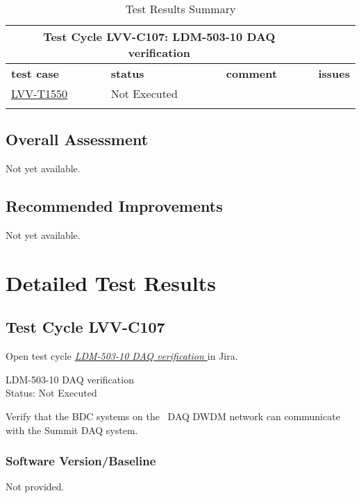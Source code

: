 \documentclass[DM,lsstdraft,STR,toc]{lsstdoc}
\begin{document}
\begin{longtable}{p{}p{}p{}p{}}
\toprule

  \multicolumn{3}{c}{ Test Cycle {\bf LVV-C107: LDM-503-10 DAQ verification
 }} \\\hline

  {\bf \footnotesize test case} & {\bf \footnotesize status} & {\bf \footnotesize comment} & {\bf \footnotesize issues} \\\toprule

    \href{https://jira.lsstcorp.org/secure/Tests.jspa#/testCase/LVV-T1550}{LVV-T1550}
    & Not Executed &  &
    \\\hline

\caption{Test Results Summary}
\label{table:summary}
\end{longtable}

\subsection{Overall Assessment}
\label{sect:overallassessment}

Not yet available.

\subsection{Recommended Improvements}
\label{sect:recommendations}

Not yet available.

\newpage
\section{Detailed Test Results}
\label{sect:detailedtestresults}


  \subsection{Test Cycle LVV-C107 }

Open test cycle {\it \href{https://jira.lsstcorp.org/secure/Tests.jspa#/testrun/LVV-C107}{LDM-503-10 DAQ verification
}} in Jira.

  LDM-503-10 DAQ verification
\\
  Status: Not Executed

  Verify that the BDC systems on the~ DAQ DWDM network can communicate
with the Summit DAQ system. ~\\[2\baselineskip]


  \subsubsection{Software Version/Baseline}
    Not provided.
\end{document}

